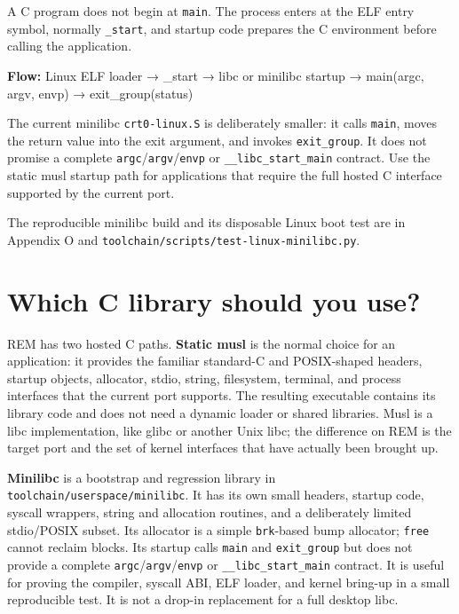 \documentclass[
  oneside,
  openany]{book}
\begin{document}
A C program does not begin at \texttt{main}. The process enters at the
ELF entry symbol, normally \texttt{\_start}, and startup code prepares
the C environment before calling the application.

\textbf{Flow:} Linux ELF loader → \_start → libc or minilibc startup →
main(argc, argv, envp) → exit\_group(status)

The current minilibc \texttt{crt0-linux.S} is deliberately smaller: it
calls \texttt{main}, moves the return value into the exit argument, and
invokes \texttt{exit\_group}. It does not promise a complete
\texttt{argc}/\texttt{argv}/\texttt{envp} or
\texttt{\_\_libc\_start\_main} contract. Use the static musl startup
path for applications that require the full hosted C interface supported
by the current port.

The reproducible minilibc build and its disposable Linux boot test are
in Appendix O and \texttt{toolchain/scripts/test-linux-minilibc.py}.

\hypertarget{which-c-library-should-you-use}{%
\section{Which C library should you
use?}\label{which-c-library-should-you-use}}

REM has two hosted C paths. \textbf{Static musl} is the normal choice
for an application: it provides the familiar standard-C and POSIX-shaped
headers, startup objects, allocator, stdio, string, filesystem,
terminal, and process interfaces that the current port supports. The
resulting executable contains its library code and does not need a
dynamic loader or shared libraries. Musl is a libc implementation, like
glibc or another Unix libc; the difference on REM is the target port and
the set of kernel interfaces that have actually been brought up.

\textbf{Minilibc} is a bootstrap and regression library in
\texttt{toolchain/userspace/minilibc}. It has its own small headers,
startup code, syscall wrappers, string and allocation routines, and a
deliberately limited stdio/POSIX subset. Its allocator is a simple
\texttt{brk}-based bump allocator; \texttt{free} cannot reclaim blocks.
Its startup calls \texttt{main} and \texttt{exit\_group} but does not
provide a complete \texttt{argc}/\texttt{argv}/\texttt{envp} or
\texttt{\_\_libc\_start\_main} contract. It is useful for proving the
compiler, syscall ABI, ELF loader, and kernel bring-up in a small
reproducible test. It is not a drop-in replacement for a full desktop
libc.
\end{document}
